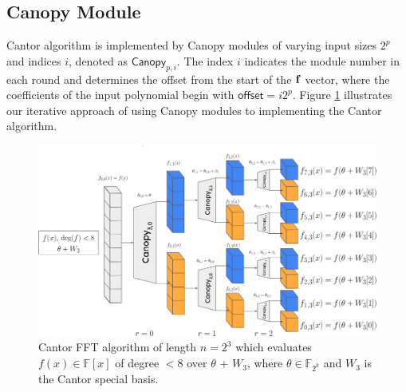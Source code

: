 \subsection{Canopy Module} \label{sec:Canopy}
Cantor algorithm is implemented by Canopy modules of varying input sizes $2^p$ and indices $i$, denoted as $\mathsf{Canopy}_{p, i}$. The index $i$ indicates the module number in each round and determines the offset from the start of the ${\bf{f}}$ vector, where the coefficients of the input polynomial begin with $\mathsf{offset} = i2^p$. Figure \ref{fig:Canopy} illustrates our iterative approach of using Canopy modules to implementing the Cantor algorithm.


 \begin{figure}
	     \centering
	     \includegraphics[width=\linewidth]{Figures/Canopy.jpg}
	     \caption{\small Cantor FFT algorithm of length $n = 2^3$ which evaluates $f(x)\in\mathbb{F}[x]$ of degree $<8$ over $\theta$ + $W_3$, where $\theta \in \mathbb{F}_{2^k}$ and $W_3$ is the Cantor special basis.}
	     \label{fig:Canopy}
	 \end{figure}%

